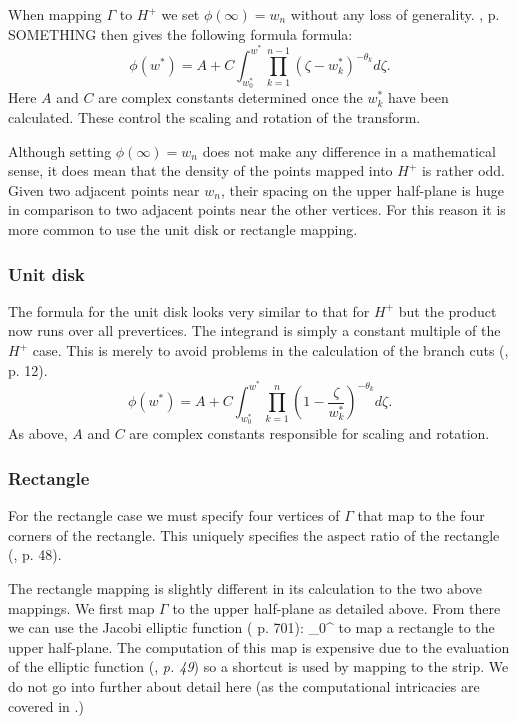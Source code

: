 When mapping $\Gamma$ to $H^+$ we set $\phi(\infty) = w_n$ without any loss of generality. \cite{driscoll}, p. SOMETHING then gives the following formula formula:
\begin{equation}
\phi(w^*) = A + C \int^{w^*}_{w^*_0} \prod_{k=1}^{n-1} (\zeta-w^*_k)^{-\theta_k} d\zeta.
\end{equation}
Here $A$ and $C$ are complex constants determined once the $w^*_k$ have been calculated. These control the scaling and rotation of the transform.

Although setting $\phi(\infty) = w_n$ does not make any difference in a mathematical sense, it does mean that the density of the points mapped into $H^+$ is rather odd. Given two adjacent points near $w_n$, their spacing on the upper half-plane is huge in comparison to two adjacent points near the other vertices. For this reason it is more common to use the unit disk or rectangle mapping. 

\subsubsection{Unit disk}

The formula for the unit disk looks very similar to that for $H^+$ but the product now runs over all prevertices. The integrand is simply a constant multiple of the $H^+$ case. This is merely to avoid problems in the calculation of the branch cuts (\cite{driscoll}, p. 12).
\begin{equation}
\label{unitscmap}
\phi(w^*) = A + C \int^{w^*}_{w^*_0} \prod_{k=1}^{n} (1 - \frac{\zeta}{w^*_k})^{-\theta_k} d\zeta.
\end{equation}
As above, $A$ and $C$ are complex constants responsible for scaling and rotation.

\subsubsection{Rectangle}
For the rectangle case we must specify four vertices of $\Gamma$ that map to the four corners of the rectangle. This uniquely specifies the aspect ratio of the rectangle (\cite{driscoll}, p. 48).

The rectangle mapping is slightly different in its calculation to the two above mappings. We first map $\Gamma$ to the upper half-plane as detailed above. From there we can use the Jacobi elliptic function (\cite{handbuch} p. 701):
\be
\int_0^\gamma {}
\ee
to map a rectangle to the upper half-plane. The computation of this map is expensive due to the evaluation of the elliptic function (\cite{driscoll}, \emph{p. 49}) so a shortcut is used by mapping to the strip. We do not go into further about detail here (as the computational intricacies are covered in \cite{howell90}.)


